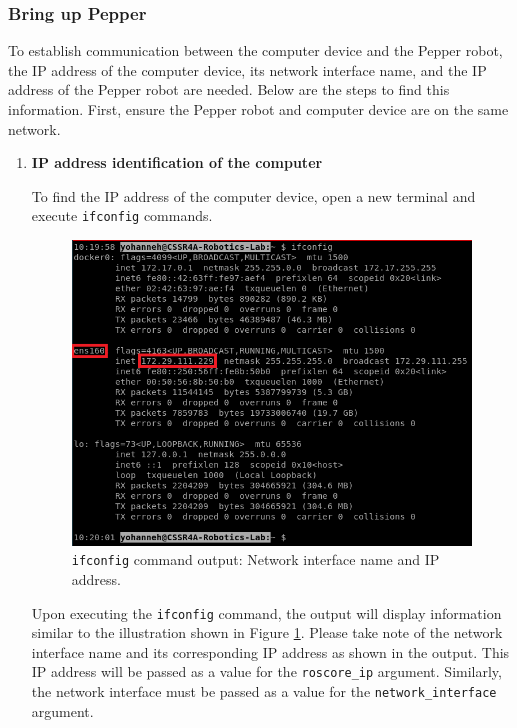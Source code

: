 \documentclass{CSSRforAfrica}
\begin{document}
{\subsubsection*{Bring up Pepper}
{
\label{bup}
To establish communication between the computer device and the Pepper robot, the IP address of the computer device, its network interface name, and the IP address of the Pepper robot are needed. Below are the steps to find this information. First, ensure the Pepper robot and computer device are on the same network.\\

\begin{enumerate}
\item \textbf{IP address identification of the computer}
{
\label{ipsystem}
To find the IP address of the computer device, open a new terminal and execute \texttt{ifconfig} commands.

\begin{figure}[!hbpt]
\centering
\includegraphics[scale=0.65]{images/Ifconfig.png}
\caption{\texttt{ifconfig} command output: Network interface name and IP address.}
\label{fig:ifconfig}
\end{figure}

Upon executing the \texttt{ifconfig} command, the output will display information similar to the illustration shown in Figure \ref{fig:ifconfig}. Please take note of the network interface name and its corresponding IP address as shown in the output. This IP address will be passed as a value for the \texttt{roscore\_ip} argument. Similarly, the network interface must be passed as a value for the \texttt{network\_interface} argument.} 
    

\end{enumerate}}}
\end{document}
